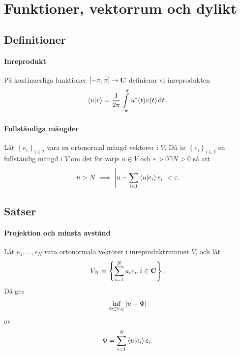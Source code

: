 \section{Funktioner, vektorrum och dylikt}

\subsection{Definitioner}

\paragraph{Inreprodukt}
På kontinuerliga funktioner $[-\pi, \pi] \to \mathbf{C}$ definierar vi inreprodukten
\begin{align*}
	\bra{u}\ket{v} = \frac{1}{2\pi}\int\limits_{-\pi}^{\pi}u^{*}(t)v(t)\dd{t}.
\end{align*}

\paragraph{Fullständiga mängder}
Låt $\left\{e_{i}\right\}_{i\in I}$ vara en ortonormal mängd vektorer i $V$. Då är $\left\{e_{i}\right\}_{i\in I}$ en fullständig mängd i $V$ om det för varje $u\in V$ och $\varepsilon >0 \exists N >0$ så att
\begin{align*}
	n > N\implies \abs{u - \sum\limits_{i\in I}\bra{u}\ket{e_{i}}e_{i}} < \varepsilon.
\end{align*}

\subsection{Satser}

\paragraph{Projektion och minsta avstånd}
Låt $e_{1}, \dots, e_{N}$ vara ortonormala vektorer i inreproduktrummet $V$, och låt
\begin{align*}
	V_{N} = \left\{\sum\limits_{i = 1}^{N}a_{i}e_{i}, i\in\mathbf{C}\right\}.
\end{align*}
Då ges
\begin{align*}
	\inf\limits_{\Phi\in V_{N}}\abs{u - \Phi}
\end{align*}
av
\begin{align*}
	\Phi = \sum\limits_{i = 1}^{N}\bra{u}\ket{e_{i}}e_{i}.
\end{align*}

\proof